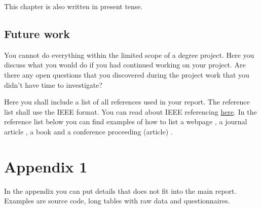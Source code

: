 \documentclass[a4paper,12pt]{article}
\begin{document}
This chapter is also written in present tense.

\subsection{Future work}
You cannot do everything within the limited scope of a degree project. Here you discuss what you would do if you had continued working on your project. Are there any open questions that you discovered during the project work that you didn't have time to investigate?

\newpage


%
\newpage

Here you shall include a list of all references used in your report. The reference list shall use the IEEE format. You can read about IEEE referencing \href{https://coursepress.lnu.se/subject/thesis-projects/ieee-references/}{here}. In the reference list below you can find examples of how to list a webpage \cite{courseroom}\cite{ieeeguide}, a journal article \cite{bigdata}, a book \cite{ai} and a conference proceeding (article) \cite{bigdata2}.

\hypersetup{urlcolor=black}


\newpage
\setcounter{page}{1} %
\appendix

\section{Appendix 1} 
In the appendix you can put details that does not fit into the main report. Examples are source code, long tables with raw data and questionnaires.
\end{document}
